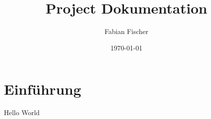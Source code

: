\documentclass{article}
\title{Project Dokumentation}
\author{Fabian Fischer}
\date{\today}
\begin{document}
\maketitle

\pagebreak
\tableofcontents
\pagebreak

\section{Einführung}

Hello World
\end{document}

